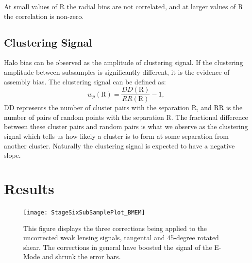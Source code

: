 \documentclass[iop]{emulateapj}
\begin{document}
At small values of R the radial bins are not correlated, and at larger values of R the correlation is non-zero.
	
\subsection{Clustering Signal} 
Halo bias can be observed as the amplitude of clustering signal. If the clustering amplitude between subsamples is significantly different, it is the evidence of assembly bias. The clustering signal can be defined as:
	\begin{equation}
		w_p (\mathrm{R}) = \frac{DD(\mathrm{R})} {RR(\mathrm{R})} - 1,
	\end{equation}
DD represents the number of cluster pairs with the separation R, and RR is the number of pairs of random points with the separation R. The fractional difference between these cluster pairs and random pairs is what we observe as the clustering signal which tells us how likely a cluster is to form at some separation from another cluster. Naturally the clustering signal is expected to have a negative slope.

\section{Results}
	\begin{figure}[h]
			\texttt{[image: StageSixSubSamplePlot\_BMEM]}
		\caption{This figure displays the three corrections being applied to the uncorrected weak lensing signals, tangental and 45-degree rotated shear. The corrections in general have boosted the signal of the E-Mode and shrunk the error bars.}
		\label{fig:StageCorrections}
	\end{figure}
\end{document}
